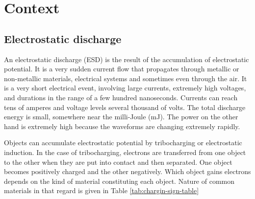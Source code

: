 \section{Context}
\subsection{Electrostatic discharge}

An electrostatic discharge (ESD) is the result of the accumulation of electrostatic potential.
It is a very sudden current flow that propagates through metallic or non-metallic materials, electrical systems and sometimes even through the air.
It is a very short electrical event, involving large currents, extremely high voltages, and durations in the range of a few hundred nanoseconds.
Currents can reach tens of amperes and voltage levels several thousand of volts.
The total discharge energy is small, somewhere near the milli-Joule (mJ).
The power on the other hand is extremely high because the waveforms are changing extremely rapidly.

Objects can accumulate electrostatic potential by tribocharging or electrostatic induction.
In the case of tribocharging, electrons are transferred from one object to the other when they are put into contact and then separated.
One object becomes positively charged and the other negatively.
Which object gains electrons depends on the kind of material constituting each object.
Nature of common materials in that regard is given in Table \ref{tab:chargin-sign-table}

